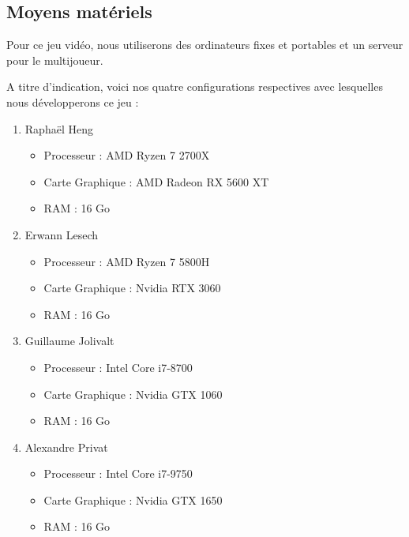 \documentclass[12pt]{article}
\begin{document}
        \subsection{Moyens matériels}
        
            \par Pour ce jeu vidéo, nous utiliserons des ordinateurs fixes et portables et un serveur pour le multijoueur.
            \par A titre d'indication, voici nos quatre configurations respectives avec lesquelles nous développerons ce jeu :
            
             \begin{enumerate}
                 \item Raphaël Heng
                    \begin{itemize}
                        \item Processeur : AMD Ryzen 7 2700X
                        \item Carte Graphique : AMD Radeon RX 5600 XT
                        \item RAM : 16 Go
                    \end{itemize}
                \clearpage
                \item Erwann Lesech
                    \begin{itemize}
                        \item Processeur : AMD Ryzen 7 5800H
                        \item Carte Graphique : Nvidia RTX 3060
                        \item RAM : 16 Go
                    \end{itemize}
                    
                \item Guillaume Jolivalt
                    \begin{itemize}
                        \item Processeur : Intel Core i7-8700
                        \item Carte Graphique : Nvidia GTX 1060
                        \item RAM : 16 Go
                    \end{itemize}
                
                \item Alexandre Privat
                    \begin{itemize}
                        \item Processeur : Intel Core i7-9750
                        \item Carte Graphique : Nvidia GTX 1650
                        \item RAM : 16 Go
                    \end{itemize}
                    
             \end{enumerate}
                    
\end{document}
